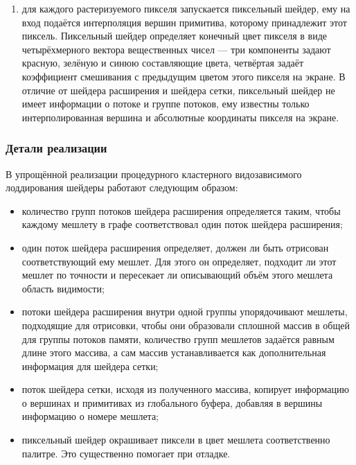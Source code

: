 \begin{enumerate}
    \item для каждого растеризуемого пикселя запускается пиксельный шейдер, ему на вход подаётся интерполяция вершин примитива, которому принадлежит этот пиксель.
    Пиксельный шейдер определяет конечный цвет пикселя в виде четырёхмерного вектора вещественных чисел --- три компоненты задают красную, зелёную и синюю составляющие цвета, четвёртая задаёт коэффициент смешивания с предыдущим цветом этого пикселя на экране.
    В отличие от шейдера расширения и шейдера сетки, пиксельный шейдер не имеет информации о потоке и группе потоков, ему известны только интерполированная вершина и абсолютные координаты пикселя на экране.
\end{enumerate}

\subsubsection*{Детали реализации}
В упрощённой реализации процедурного кластерного видозависимого лоддирования шейдеры работают следующим образом:
\begin{itemize}
    \item количество групп потоков шейдера расширения определяется таким, чтобы каждому мешлету в графе соответствовал один поток шейдера расширения;
    \item один поток шейдера расширения определяет, должен ли быть отрисован соответствующий ему мешлет.
    Для этого он определяет, подходит ли этот мешлет по точности и пересекает ли описывающий объём этого мешлета область видимости;
    \item потоки шейдера расширения внутри одной группы упорядочивают мешлеты, подходящие для отрисовки, чтобы они образовали сплошной массив в общей для группы потоков памяти, количество групп мешлетов задаётся равным длине этого массива, а сам массив устанавливается как дополнительная информация для шейдера сетки;
    \item поток шейдера сетки, исходя из полученного массива, копирует информацию о вершинах и примитивах из глобального буфера, добавляя в вершины информацию о номере мешлета;
    \item пиксельный шейдер окрашивает пиксели в цвет мешлета соответственно палитре.
    Это существенно помогает при отладке.
\end{itemize}

